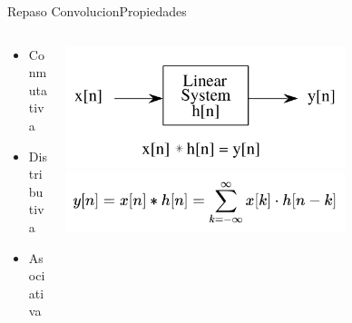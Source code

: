 \begin{frame}{Repaso Convolucion}{Propiedades}
   \begin{columns}[c]
      \hspace{5pt}
      \begin{column}{.2\textwidth}
         \begin{itemize}
            \item{Conmutativa}
            \item{Distributiva}
            \item{Asociativa}
         \end{itemize}
      \end{column}
      \hspace{2pt}
      \vrule
      \hspace{2pt}
      \begin{column}{.8\textwidth}
         \centering\includegraphics[width=0.7\textwidth]{4_clase/entrada_conv_h}\\
         \centering\includegraphics[width=0.7\textwidth]{4_clase/convolucion_eq}
      \end{column}
      \hspace{2pt}
   \end{columns}
   \vfill
\end{frame}
